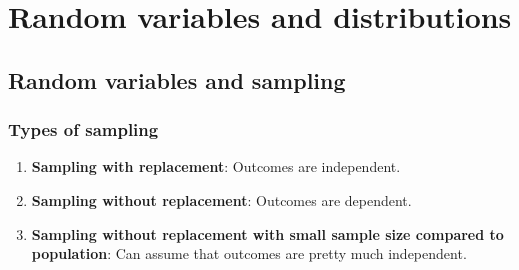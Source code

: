 
\chapter{Random variables and distributions}

\section{Random variables and sampling}
\subsection{Types of sampling}

\begin{enumerate}
    \item \textbf{Sampling with replacement}: Outcomes are independent.
    \item \textbf{Sampling without replacement}: Outcomes are dependent.
    \item \textbf{Sampling without replacement with small sample size compared to population}: Can assume that outcomes are pretty much independent.
\end{enumerate}



